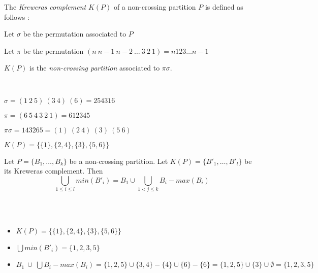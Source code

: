 \begin{definition}
    The \emph{Kreweras complement} $K (P)$ of a non-crossing
    partition $P$ is defined as follows :\\
    \begin{itemize*}
        \item Let $\sigma$ be the permutation associated to $P$\\
        \item Let $\pi$ be the permutation $(n\ n-1\ n-2\
        \ldots\ 3\ 2\ 1) = n123 \ldots n-1$\\
        \item $K (P)$ is the \emph{non-crossing partition}
        associated to $\pi \sigma$.\\
    \end{itemize*}
\end{definition}

\begin{example}[$P = \{\{1, 2, 5\}, \{3, 4\}, \{6\}\}$]
    ~\\
    \begin{itemize*}
        \item $\sigma = (1\ 2\ 5)\ (3\ 4)\ (6) = 254316$\\
        \item $\pi = (6\ 5\ 4\ 3\ 2\ 1) = 612345$\\
        \item $\pi \sigma = 143265 = (1)\ (2\ 4)\ (3)\ (5\ 6)$\\
        \item $K(P) = \{\{1\},\{2, 4\}, \{3\}, \{5, 6\}\}$\\
    \end{itemize*}
\end{example}

\begin{prop}
        Let $P = \{B_1, \ldots, B_k\}$ be a non-crossing partition.
        Let $K (P) = \{B'_1, \ldots, B'_l\}$ be its Kreweras complement.
        Then $$\bigcup_{1 \leq i \leq l}{min (B'_i)} =
        B_1 \cup \bigcup_{1 < j \leq k}{B_i - {max (B_i)}}$$\\
\end{prop}

\begin{example}[$P = \{\{1, 2, 5\}, \{3, 4\}, \{6\}\}$]
    ~\\
    \begin{itemize}
        \item $K (P) = \{\{1\},\{2, 4\}, \{3\}, \{5, 6\}\}$
        \item $\bigcup{min (B'_i)} = \{1, 2, 3, 5\}$
        \item $B_1\ \cup\ \bigcup{B_i - {max (B_i)}}
        = \{1, 2, 5\} \cup \{3, 4\} - \{4\} \cup \{6\} - \{6\}
        = \{1, 2, 5\} \cup \{3\} \cup \emptyset = \{1, 2, 3, 5\}$\\
    \end{itemize}
\end{example}

